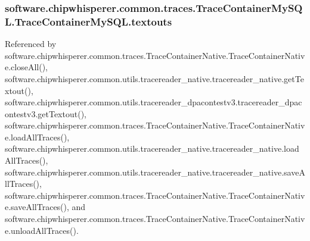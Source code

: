 \hypertarget{classsoftware_1_1chipwhisperer_1_1common_1_1traces_1_1TraceContainerMySQL_1_1TraceContainerMySQL_a9af646b8517531b97ae647bbfa8846f0}{}
\subsubsection[{textouts}]{\setlength{\rightskip}{0pt plus 5cm}software.\+chipwhisperer.\+common.\+traces.\+Trace\+Container\+My\+S\+Q\+L.\+Trace\+Container\+My\+S\+Q\+L.\+textouts}\label{classsoftware_1_1chipwhisperer_1_1common_1_1traces_1_1TraceContainerMySQL_1_1TraceContainerMySQL_a9af646b8517531b97ae647bbfa8846f0}


Referenced by software.\+chipwhisperer.\+common.\+traces.\+Trace\+Container\+Native.\+Trace\+Container\+Native.\+close\+All(), software.\+chipwhisperer.\+common.\+utils.\+tracereader\+\_\+native.\+tracereader\+\_\+native.\+get\+Textout(), software.\+chipwhisperer.\+common.\+utils.\+tracereader\+\_\+dpacontestv3.\+tracereader\+\_\+dpacontestv3.\+get\+Textout(), software.\+chipwhisperer.\+common.\+traces.\+Trace\+Container\+Native.\+Trace\+Container\+Native.\+load\+All\+Traces(), software.\+chipwhisperer.\+common.\+utils.\+tracereader\+\_\+native.\+tracereader\+\_\+native.\+load\+All\+Traces(), software.\+chipwhisperer.\+common.\+utils.\+tracereader\+\_\+native.\+tracereader\+\_\+native.\+save\+All\+Traces(), software.\+chipwhisperer.\+common.\+traces.\+Trace\+Container\+Native.\+Trace\+Container\+Native.\+save\+All\+Traces(), and software.\+chipwhisperer.\+common.\+traces.\+Trace\+Container\+Native.\+Trace\+Container\+Native.\+unload\+All\+Traces().

\hypertarget{classsoftware_1_1chipwhisperer_1_1common_1_1traces_1_1TraceContainerMySQL_1_1TraceContainerMySQL_a88a0ccb5f2231cec74b1642f34979def}{}
